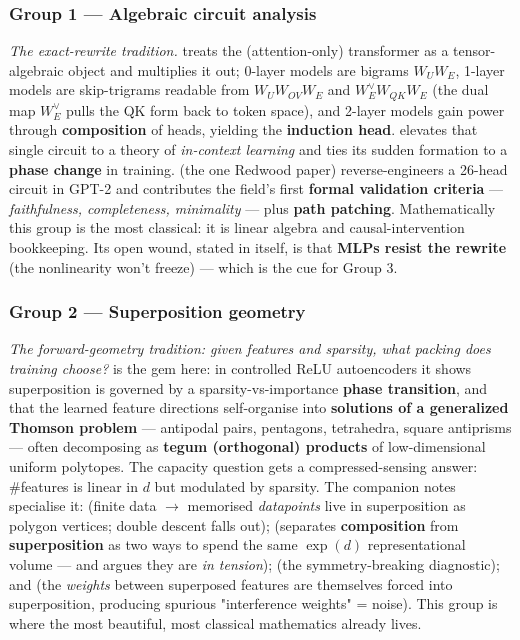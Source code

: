 \subsubsection*{Group 1 --- Algebraic circuit analysis}
\emph{The exact-rewrite tradition.} \textcite{framework} treats the (attention-only) transformer as a tensor-algebraic object and multiplies it out; 0-layer models are bigrams $W_U W_E$, 1-layer models are skip-trigrams readable from $W_U W_{OV} W_E$ and $W_E^{\vee} W_{QK} W_E$ (the dual map $W_E^{\vee}$ pulls the QK form back to token space), and 2-layer models gain power through \textbf{composition} of heads, yielding the \textbf{induction head}. \textcite{induction-heads} elevates that single circuit to a theory of \emph{in-context learning} and ties its sudden formation to a \textbf{phase change} in training. \textcite{interpretability-in-the-wild-ioi} (the one Redwood paper) reverse-engineers a 26-head circuit in GPT-2 and contributes the field's first \textbf{formal validation criteria} --- \emph{faithfulness, completeness, minimality} --- plus \textbf{path patching}. Mathematically this group is the most classical: it is linear algebra and causal-intervention bookkeeping. Its open wound, stated in \textcite{framework} itself, is that \textbf{MLPs resist the rewrite} (the nonlinearity won't freeze) --- which is the cue for Group 3.


\subsubsection*{Group 2 --- Superposition geometry}
\emph{The forward-geometry tradition: given features and sparsity, what packing does training choose?} \textcite{toy-models-superposition} is the gem here: in controlled ReLU autoencoders it shows superposition is governed by a sparsity-vs-importance \textbf{phase transition}, and that the learned feature directions self-organise into \textbf{solutions of a generalized Thomson problem} --- antipodal pairs, pentagons, tetrahedra, square antiprisms --- often decomposing as \textbf{tegum (orthogonal) products} of low-dimensional uniform polytopes. The capacity question gets a compressed-sensing answer: \#features is linear in $d$ but modulated by sparsity. The companion notes specialise it: \textcite{superposition-memorization-double-descent} (finite data $\to$ memorised \emph{datapoints} live in superposition as polygon vertices; double descent falls out); \textcite{distributed-representations-composition-superposition} (separates \textbf{composition} from \textbf{superposition} as two ways to spend the same $\exp(d)$ representational volume --- and argues they are \emph{in tension}); \textcite{privileged-bases-residual-stream} (the symmetry-breaking diagnostic); and \textcite{toy-model-of-interference-weights} (the \emph{weights} between superposed features are themselves forced into superposition, producing spurious "interference weights" = noise). This group is where the most beautiful, most classical mathematics already lives.


